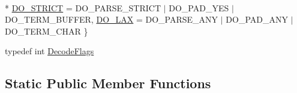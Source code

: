 \begin{DoxyCompactItemize}
\\*
\hyperlink{classmsfs_1_1_base64_aca79ad65b25bf05b3e953ddd844cef2fafc492da1d0a77df595410e2a46bea340}{D\+O\+\_\+\+S\+T\+R\+I\+C\+T} = D\+O\+\_\+\+P\+A\+R\+S\+E\+\_\+\+S\+T\+R\+I\+C\+T $\vert$ D\+O\+\_\+\+P\+A\+D\+\_\+\+Y\+E\+S $\vert$ D\+O\+\_\+\+T\+E\+R\+M\+\_\+\+B\+U\+F\+F\+E\+R, 
\hyperlink{classmsfs_1_1_base64_aca79ad65b25bf05b3e953ddd844cef2fa54816f565aa1e2b44209d1b70b74c307}{D\+O\+\_\+\+L\+A\+X} = D\+O\+\_\+\+P\+A\+R\+S\+E\+\_\+\+A\+N\+Y $\vert$ D\+O\+\_\+\+P\+A\+D\+\_\+\+A\+N\+Y $\vert$ D\+O\+\_\+\+T\+E\+R\+M\+\_\+\+C\+H\+A\+R
 \}
\item 
typedef int \hyperlink{classmsfs_1_1_base64_ab044f6b279e3a3c6004dd58ea625b3c7}{Decode\+Flags}
\end{DoxyCompactItemize}
\subsection*{Static Public Member Functions}
